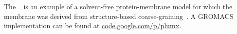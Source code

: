 The ~\cite{bereau12} is an example of a solvent-free
protein-membrane model for which the membrane was derived from structure-based
coarse-graining~\cite{wang_jpcb10}.  A GROMACS implementation can be found at
\href{http://code.google.com/p/plumx/}{code.google.com/p/plumx}. 

